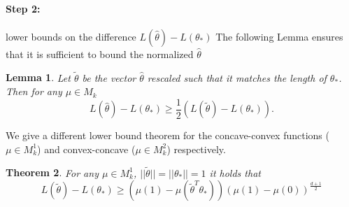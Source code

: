 \documentclass[twoside]{article} \usepackage{aistats2017}
\newtheorem{theorem}{Theorem}
\newtheorem{lemma}[theorem]{Lemma}
\begin{document}
\paragraph{Step 2:} lower bounds on the difference $L(\hat{\theta})-L(\theta_*)$
The following Lemma ensures that it is sufficient to bound the normalized $\hat{\theta}$
\begin{lemma}\label{normthetabound}
    Let $\tilde{\theta}$ be the vector $\hat{\theta}$ rescaled such that it matches the length of $\theta_*$. Then for any $\mu\in M_k$
    $$L(\hat{\theta})-L(\theta_*) \geq \frac{1}{2}(L(\tilde{\theta})-L(\theta_*)).$$
\end{lemma}
We give a different lower bound theorem for the concave-convex functions ($\mu\in M_k^1$) and convex-concave ($\mu\in M_k^2$) respectively.
\begin{theorem}
For any $\mu \in M_k^1$, $||\tilde{\theta}||=||\theta_*||=1$ it holds that
$$L(\tilde{\theta})-L(\theta_*) \geq (\mu(1)-\mu(\tilde{\theta}^T\theta_*))(\mu(1)-\mu(0))^{\frac{d+1}{2}}$$
\end{theorem}
\end{document}
